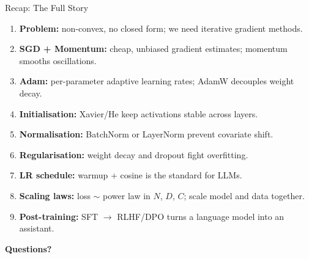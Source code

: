 \documentclass[aspectratio=169, professionalfonts]{beamer}
\begin{document}
\begin{frame}{Recap: The Full Story}

\begin{enumerate}
  \item \textbf{Problem:} non-convex, no closed form;
        we need iterative gradient methods.
  \item \textbf{SGD + Momentum:} cheap, unbiased gradient estimates;
        momentum smooths oscillations.
  \item \textbf{Adam:} per-parameter adaptive learning rates;
        AdamW decouples weight decay.
  \item \textbf{Initialisation:} Xavier/He keep activations stable
        across layers.
  \item \textbf{Normalisation:} BatchNorm or LayerNorm prevent
        covariate shift.
  \item \textbf{Regularisation:} weight decay and dropout
        fight overfitting.
  \item \textbf{LR schedule:} warmup + cosine is the standard
        for LLMs.
  \item \textbf{Scaling laws:} loss $\sim$ power law in $N$, $D$, $C$;
        scale model and data together.
  \item \textbf{Post-training:} SFT $\to$ RLHF/DPO turns a
        language model into an assistant.
\end{enumerate}

\end{frame}

{
\begin{frame}[c]
\centering
\Huge\textbf{Questions?}
\end{frame}
}
\end{document}
